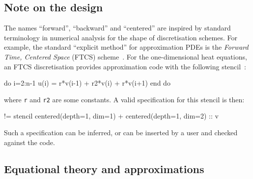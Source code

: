 \documentclass[9pt]{sigplanconf}
\theoremstyle{definition}
\begin{document}
\subsection{Note on the design}

The names ``forward'', ``backward'' and ``centered''
are inspired by standard terminology in numerical analysis
for the shape of discretisation schemes. For example,
the standard ``explicit method'' for approximation
PDEs is the \emph{Forward Time, Centered Space} (FTCS)
scheme~\cite{dawson1991finite}. For
the one-dimensional heat equations, an FTCS discretisation 
provides approximation code with the following stencil~\cite{recktenwald2004finite}:
\begin{ExmVerbatim}
do i=2:n-1
  u(i) = r*v(i-1) + r2*v(i) + r*v(i+1)
end do
\end{ExmVerbatim}
where \texttt{r} and \texttt{r2} are some constants. 
A valid specification for this stencil is then:
\begin{ExmVerbatim}
!= stencil centered(depth=1, dim=1) 
         + centered(depth=1, dim=2) :: v
\end{ExmVerbatim}
Such a specification can be inferred, or can be inserted by a user
and checked against the code.

\subsection{Equational theory and approximations}
\label{sec:eqs}
\end{document}
